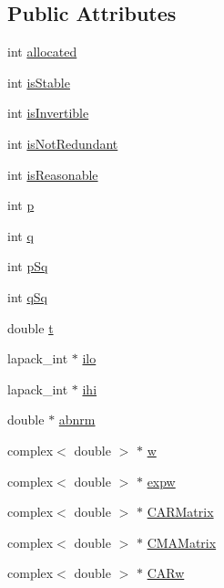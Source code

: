 \subsection*{Public Attributes}
\begin{DoxyCompactItemize}
\item 
int \hyperlink{class_c_a_r_m_a_a54245682ab3eba1ba3fde0898f9898a6}{allocated}
\item 
int \hyperlink{class_c_a_r_m_a_a5234c38768e071f37c8a6bdfaf06f499}{is\-Stable}
\item 
int \hyperlink{class_c_a_r_m_a_ab8907880b6740bbc95f011957495d41b}{is\-Invertible}
\item 
int \hyperlink{class_c_a_r_m_a_a1da5f1d423116967c885b09cd4729ca3}{is\-Not\-Redundant}
\item 
int \hyperlink{class_c_a_r_m_a_a845e25047e97b9b629b32a3c592f3d29}{is\-Reasonable}
\item 
int \hyperlink{class_c_a_r_m_a_a69668ba1aef7197cc54078cd0ae94ce2}{p}
\item 
int \hyperlink{class_c_a_r_m_a_a3322588d9691b02ebb6e7e1b4f9c8ecf}{q}
\item 
int \hyperlink{class_c_a_r_m_a_a6ae0464e80be268753c9421f7a103562}{p\-Sq}
\item 
int \hyperlink{class_c_a_r_m_a_a7fc41676954abf3a5b1c74f4ac8abe25}{q\-Sq}
\item 
double \hyperlink{class_c_a_r_m_a_a47e298ceac5c77b96f70f520119d0eb7}{t}
\item 
lapack\-\_\-int $\ast$ \hyperlink{class_c_a_r_m_a_a2faca89f81a95b8d788445b99527d79c}{ilo}
\item 
lapack\-\_\-int $\ast$ \hyperlink{class_c_a_r_m_a_a3def910e9268fefd309b90a98e13d323}{ihi}
\item 
double $\ast$ \hyperlink{class_c_a_r_m_a_a38d4be056f99144dd726b8a522873200}{abnrm}
\item 
complex$<$ double $>$ $\ast$ \hyperlink{class_c_a_r_m_a_a34484d60e14f53e2e2bb378a4e9e7344}{w}
\item 
complex$<$ double $>$ $\ast$ \hyperlink{class_c_a_r_m_a_a53bc76be0e75d214cb9bc18bdf07cab9}{expw}
\item 
complex$<$ double $>$ $\ast$ \hyperlink{class_c_a_r_m_a_a4753a35f5afb7c4f3a51f1fbfd8ddc96}{C\-A\-R\-Matrix}
\item 
complex$<$ double $>$ $\ast$ \hyperlink{class_c_a_r_m_a_ae9fc6695efc343e26009ce33d07fdf27}{C\-M\-A\-Matrix}
\item 
complex$<$ double $>$ $\ast$ \hyperlink{class_c_a_r_m_a_a999a48a6285c64b5ce971cfbd2a4a549}{C\-A\-Rw}

\end{DoxyCompactItemize}
